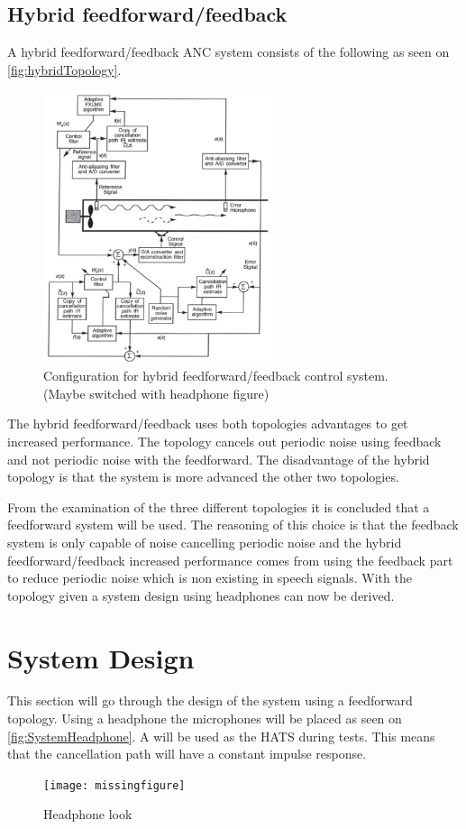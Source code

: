 \subsection*{Hybrid feedforward/feedback}    
A hybrid feedforward/feedback ANC system consists of the following as seen on \autoref{fig:hybridTopology}.
\begin{figure}[H]
	\centering
	\includegraphics[width=0.6\textwidth]{figures/BasicSystem/hybrid}
	\caption{Configuration for hybrid feedforward/feedback control system. (Maybe switched with headphone figure)}
	\label{fig:hybridTopology}
\end{figure}

The hybrid feedforward/feedback uses both topologies advantages to get increased performance. The topology cancels out periodic noise using feedback and not periodic noise with the feedforward. The disadvantage of the hybrid topology is that the system is more advanced the other two topologies.   

From the examination of the three different topologies it is concluded that a feedforward system will be used. The reasoning of this choice is that the feedback system is only capable of noise cancelling periodic noise and the hybrid feedforward/feedback increased performance comes from using the feedback part to reduce periodic noise which is non existing in speech signals. With the topology given a system design using headphones can now be derived. 




\section{System Design} \label{sec:systemDesign}
This section will go through the design of the system using a feedforward topology. Using a headphone the microphones will be placed as seen on \autoref{fig:SystemHeadphone}. A  will be used as the HATS during tests. This means that the cancellation path will have a constant impulse response. 
\begin{figure}[H]
	\centering
	\texttt{[image: missingfigure]}
	\caption{Headphone look}
	\label{fig:SystemHeadphone}
\end{figure}  

